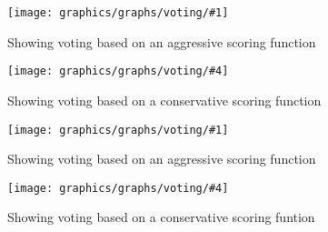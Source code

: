 \newcommand{\votinggraphs}[6]{
    \begin{figure}[h!]
    \begin{minipage}[t]{0.5\textwidth}
        \texttt{[image: graphics/graphs/voting/\#1]}
        \caption{#2}
        \label{#3}
    \end{minipage}
    \hspace*{\fill} %
    \begin{minipage}[t]{0.5\textwidth}
        \texttt{[image: graphics/graphs/voting/\#4]}
        \caption{#5}
        \label{#6}
    \end{minipage}
    \end{figure}
}

\newcommand{\easyvotinggraphs}[5]{ %
  \votinggraphs
  {voting-False_cover_rate_(FCR)-#1-Aggressive.pdf}{#2}{#3}
  {voting-False_cover_rate_(FCR)-#1-Conservative.pdf}{#4}{#5}
}


\easyvotinggraphs{Events_hit_rate_(EHR)}
{Showing voting based on an aggressive scoring function}{fig:voting_aggresive_ehr}
{Showing voting based on a conservative scoring function}{fig:voting_conservative_ehr}


\easyvotinggraphs{Precision}
{Showing voting based on an aggressive scoring function}{fig:voting_aggressive_pres}
{Showing voting based on a conservative scoring funtion}{fig:voting_conservative_pres}

%
%
%

